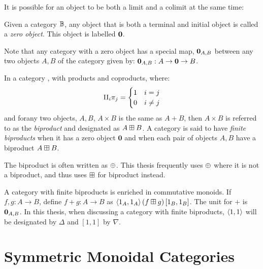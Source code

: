 It is possible for an object to be both a limit and a colimit at the same time:
\begin{definition}\label{def:categorical_zero}
  Given a category $\mathbb{B}$, any object that is both a terminal and initial object is called a
  \emph{zero object}. This object is labelled $\mathbf{0}$.
\end{definition}

Note that any category with a zero object has a special map, $\mathbf{0}_{A,B}$
between any two objects $A,B$ of the category given by: $\mathbf{0}_{A,B} : A \to \mathbf{0} \to B$.

\begin{definition}\label{def:categorical_biproduct}
  In a category \B, with products and coproducts, where:
  \[
    \amalg_{i}\pi_j = \begin{cases}
      1 & i = j\\
      0 & i \neq j
      \end{cases}
  \]
  and forany two objects, $A,B$, $A\times B$ is the same as $A+B$, then $A\times B$ is
  referred to as the \emph{biproduct} and designated as $A\boxplus B$. A category \cD{} is said to
  have \emph{finite biproducts} when it has a zero object $\mathbf{0}$ and when each pair of objects
  $A,B$ have a biproduct $A\boxplus B$.

  The biproduct is often written as $\oplus$. This thesis frequently uses $\oplus$ where it is not a
  biproduct, and thus uses $\boxplus$ for biproduct instead.
\end{definition}

A category with finite biproducts is enriched in commutative monoids. If $f,g:A\to
B$, define $f+g:A\to B$ as $\langle1_{A}, 1_{A}\rangle\, (f\boxplus g)\, [1_{B},1_{B}]$. The unit for
$+$ is $\mathbf{0}_{A,B}$. In this thesis, when discussing a category with finite biproducts,
$\langle1, 1\rangle$ will be designated by $\Delta$ and $[1,1]$ by $\nabla$.



\section{Symmetric Monoidal Categories} %
\label{sub:categories_with_additional_structure}

